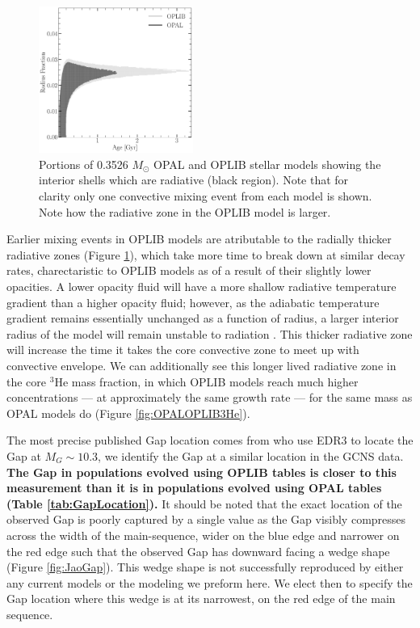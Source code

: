 \begin{figure}
	\centering
	\includegraphics[width=0.45\textwidth]{SameMassConvectiveZoneComp.pdf}
	\caption{Portions of 0.3526 $M_{\odot}$ OPAL and OPLIB stellar models
	showing the interior shells which are radiative (black region). Note that
	for clarity only one convective mixing event from each model is shown. Note
	how the radiative zone in the OPLIB model is larger.}
	\label{fig:Unstable}
\end{figure}

Earlier mixing events in OPLIB models are atributable to the radially thicker
radiative zones (Figure \ref{fig:Unstable}), which take more time to break down
at similar decay rates, charectaristic to OPLIB models as of a result of their
slightly lower opacities. A lower opacity fluid will have a more shallow
radiative temperature gradient than a higher opacity fluid; however, as the
adiabatic temperature gradient remains essentially unchanged as a function of
radius, a larger interior radius of the model will remain unstable to radiation
. This thicker radiative zone will increase the time it takes the core
convective zone to meet up with convective envelope. We can additionally see
this longer lived radiative zone in the core $^{3}$He mass fraction, in which
OPLIB models reach much higher concentrations --- at approximately the same
growth rate --- for the same mass as OPAL models do (Figure
\ref{fig:OPALOPLIB3He}). 

The most precise published Gap location comes from \citet{Jao2020} who use EDR3
to locate the Gap at $M_{G} \sim 10.3$, we identify the Gap at a similar
location in the GCNS data. \textbf{The Gap in populations evolved using OPLIB
tables is closer to this measurement than it is in populations evolved using
OPAL tables (Table \ref{tab:GapLocation}).} It should be noted that the exact
location of the observed Gap is poorly captured by a single value as the Gap
visibly compresses across the width of the main-sequence, wider on the blue
edge and narrower on the red edge such that the observed Gap has downward
facing a wedge shape (Figure \ref{fig:JaoGap}). This wedge shape is not
successfully reproduced by either any current models or the modeling we preform
here. We elect then to specify the Gap location where this wedge is at its
narrowest, on the red edge of the main sequence.


